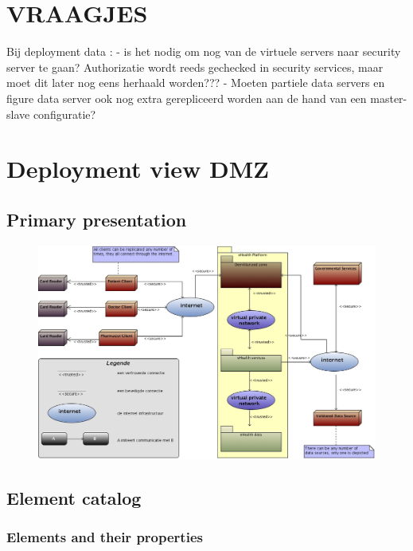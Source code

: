 \documentclass[a4paper,10pt]{book}
\begin{document}
\section{VRAAGJES}

Bij deployment data : 
	- is het nodig om nog van de virtuele servers naar security server te gaan?
 	  Authorizatie wordt reeds gechecked in security services, maar moet dit later
	  nog eens herhaald worden???
	- Moeten partiele data servers en figure data server ook nog extra gerepliceerd
	  worden aan de hand van een master-slave configuratie?


\section{Deployment view DMZ}

\subsection{Primary presentation}
\begin{center}
    \begin{figure}
      \includegraphics[width=\textwidth]{../images/deployment_DMZ.jpg}
    \end{figure}
  \end{center}

\subsection{Element catalog}

\subsubsection{Elements and their properties}
\end{document}
